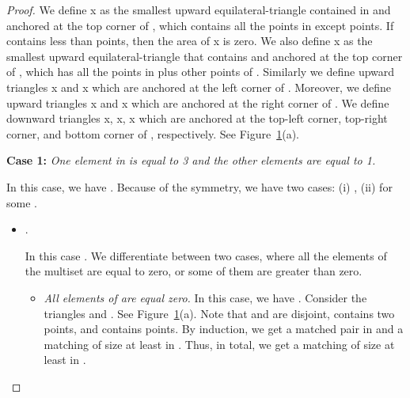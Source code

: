\documentclass[11pt,a4paper]{article}
\begin{document}
\begin{proof}
We define x as the smallest upward equilateral-triangle contained in  and anchored at the top corner of , which contains all the points in  except  points. If  contains less than  points, then the area of x is zero. We also define x as the smallest upward equilateral-triangle that contains  and anchored at the top corner of , which has all the points in  plus  other points of . Similarly we define upward triangles x and x which are anchored at the left corner of . Moreover, we define upward triangles x and x which are anchored at the right corner of . We define downward triangles x, x, x which are anchored at the top-left corner, top-right corner, and bottom corner of , respectively. See Figure~\ref{Theta-six-fig}(a). 

{\bf Case 1:} {\em One element in  is equal to 3 and the other elements are equal to 1.}

In this case, we have . Because of the symmetry, we have two cases: (i) , (ii)  for some .

\begin{itemize}
 
\begin{figure}[h!]
  \centering
\setlength{\tabcolsep}{0in}
  
  \caption{(a) Split  into four equal area triangles. (b)  is larger than  and .}
\label{Theta-six-fig}
\end{figure}

 \item {.}

In this case . We differentiate between two cases, where all the elements of the multiset  are equal to zero, or some of them are greater than zero.

\begin{itemize}
 \item {\em All elements of  are equal zero.} In this case, we have . Consider the triangles  and . See Figure~\ref{Theta-six-fig}(a). Note that  and  are disjoint,  contains two points, and  contains  points. By induction, we get a matched pair in  and a matching of size at least  in . Thus, in total, we get a matching of size at least  in .


\end{itemize}
\end{itemize}
\end{proof}
\end{document}
